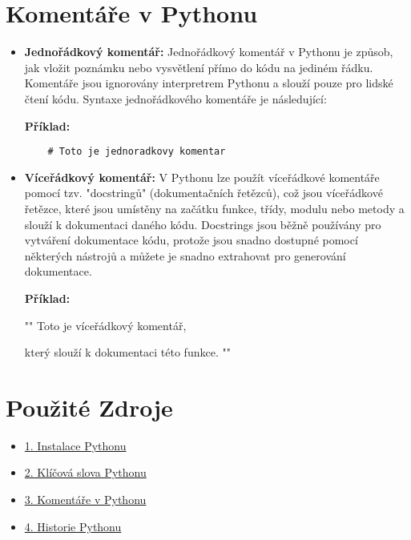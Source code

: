 \documentclass[12pt,a4paper]{article}
\begin{document}
\section{Komentáře v Pythonu}
\begin{itemize}
\item \textbf{Jednořádkový komentář:} Jednořádkový komentář v Pythonu je způsob, jak vložit poznámku nebo vysvětlení přímo do kódu na jediném řádku. Komentáře jsou ignorovány interpretrem Pythonu a slouží pouze pro lidské čtení kódu. Syntaxe jednořádkového komentáře je následující:

\textbf{Příklad:}
\begin{lstlisting}
    # Toto je jednoradkovy komentar
\end{lstlisting}
\item \textbf{Víceřádkový komentář:} V Pythonu lze použít víceřádkové komentáře pomocí tzv. "docstringů" (dokumentačních řetězců), což jsou víceřádkové řetězce, které jsou umístěny na začátku funkce, třídy, modulu nebo metody a slouží k dokumentaci daného kódu. Docstrings jsou běžně používány pro vytváření dokumentace kódu, protože jsou snadno dostupné pomocí některých nástrojů a můžete je snadno extrahovat pro generování dokumentace.

\textbf{Příklad:}

""
    Toto je víceřádkový komentář,

    který slouží k dokumentaci této funkce.
    ""

\end{itemize}
\section{Použité Zdroje}
\begin{itemize}
  \item \href{https://kitner.cz/testovani_softwaru/jak-nainstalovat-python/}{1. Instalace Pythonu}
  \item \href{https://quizlet.com/503181776/python-klicova-slova-flash-cards/}{2. Klíčová slova Pythonu}
  \item \href{https://training.gismentors.eu/geopython-zacatecnik/python/comments.html}{3. Komentáře v Pythonu}
  \item \href{https://en.wikipedia.org/wiki/Python_(programming_language)}{4. Historie Pythonu}
\end{itemize}
\end{document}
